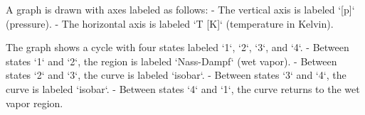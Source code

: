 A graph is drawn with axes labeled as follows:  
- The vertical axis is labeled `[p]` (pressure).  
- The horizontal axis is labeled `T [K]` (temperature in Kelvin).  

The graph shows a cycle with four states labeled `1`, `2`, `3`, and `4`.  
- Between states `1` and `2`, the region is labeled `Nass-Dampf` (wet vapor).  
- Between states `2` and `3`, the curve is labeled `isobar`.  
- Between states `3` and `4`, the curve is labeled `isobar`.  
- Between states `4` and `1`, the curve returns to the wet vapor region.